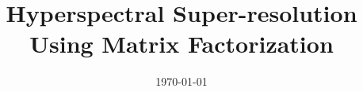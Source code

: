 \documentclass[a4paper, 11pt, oneside]{Thesis}
\begin{document}
\frontmatter

\title  {Hyperspectral Super-resolution Using Matrix Factorization}
\addresses  {\groupname\\\deptname\\\univname}
\date       {\today}
\subject    {}
\keywords   {}

\maketitle


\fancyhead{}                      %
\rhead{\thepage}                  %
\lhead{}                          %

\pagestyle{fancy}                 %
\end{document}
